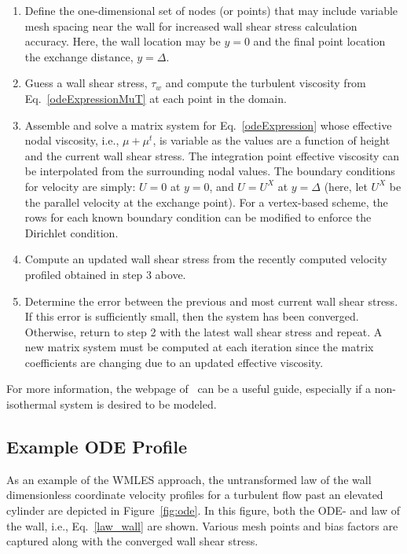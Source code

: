 \documentclass{article}
\begin{document}
\begin{enumerate}

\item Define the one-dimensional set of nodes (or points) that may include variable mesh spacing 
near the wall for increased wall shear stress calculation accuracy. Here, the wall location may be 
$y = 0$ and the final point location the exchange distance, $y = \Delta$.

\item Guess a wall shear stress, $\tau_w$ and compute the turbulent viscosity from Eq.~\ref{odeExpressionMuT}
at each point in the domain.

\item Assemble and solve a matrix system for Eq.~\ref{odeExpression} whose effective 
nodal viscosity, i.e.,  $\mu + \mu^t$, is variable as the values are a function of height
and the current wall shear stress. The integration point effective viscosity can be interpolated 
from the surrounding nodal values. The boundary conditions for velocity are simply: $U = 0$ at $y =0$, 
and $U = U^X$ at $y = \Delta$ (here, let $U^X$ be the parallel velocity at the exchange point).
For a vertex-based scheme, the rows for each known boundary condition can be modified to enforce 
the Dirichlet condition. 

\item Compute an updated wall shear stress from the recently computed velocity profiled obtained in 
step 3 above.

\item Determine the error between the previous and most current wall shear stress. If this error is 
sufficiently small, then the system has been converged. Otherwise, return to step 2 with the latest 
wall shear stress and repeat. A new matrix system must be computed at each iteration since the 
matrix coefficients are changing due to an updated effective viscosity. 

\end{enumerate}

For more information, the webpage of~\cite{larssonWebpage} can be a useful guide, especially if a 
non-isothermal system is desired to be modeled.

\subsection{Example ODE Profile}
As an example of the WMLES approach, the untransformed law of the wall dimensionless coordinate velocity profiles 
for a turbulent flow past an elevated cylinder are depicted in Figure~\ref{fig:ode}. In this figure, both the ODE- and
law of the wall, i.e., Eq.~\ref{law_wall} are shown. Various mesh points and bias factors are captured along with the 
converged wall shear stress.
\end{document}

